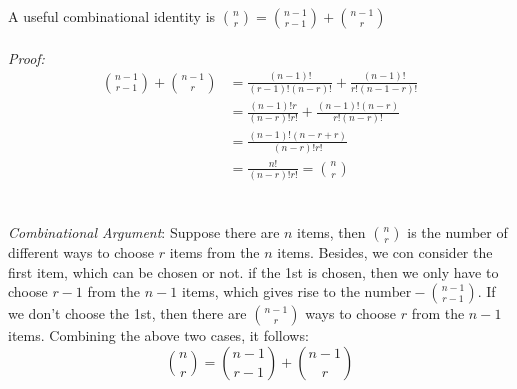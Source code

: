 \documentclass[11pt, letterpaper]{article}
\begin{document}
\noindent
A useful combinational identity is $\binom{n}{r} = \binom{n-1}{r-1} + \binom{n-1}{r}$ \\ \\
\textit{Proof:}
\begin{align*}
  \binom{n-1}{r-1} + \binom{n-1}{r} &= \frac{(n-1)!}{(r-1)!(n-r)!} + \frac{(n-1)!}{r!(n-1-r)!} \\
  &= \frac{(n-1)!r}{(n-r)! r!} + \frac{(n-1)!(n-r)}{r!(n-r)!} \\
  &= \frac{(n-1)!(n-r+r)}{(n-r)!r!} \\
  &= \frac{n!}{(n-r)!r!} = \binom{n}{r}
\end{align*} \\ \\

\noindent
\textit{Combinational Argument}: Suppose there are $n$ items, then $\binom{n}{r}$ is the number of different ways to choose $r$ items from the $n$ items. Besides, we con consider the first item, which can be chosen or not. if the 1st is chosen, then we only have to choose $r-1$ from the $n-1$ items, which gives rise to the $\text{number} - \binom{n-1}{r-1}$. If we don't choose the 1st, then there are $\binom{n-1}{r}$ ways to choose $r$ from the $n-1$ items. Combining the above two cases, it follows:
\begin{equation*}
  \binom{n}{r} = \binom{n-1}{r-1} + \binom{n-1}{r}
\end{equation*} \clearpage
\end{document}
